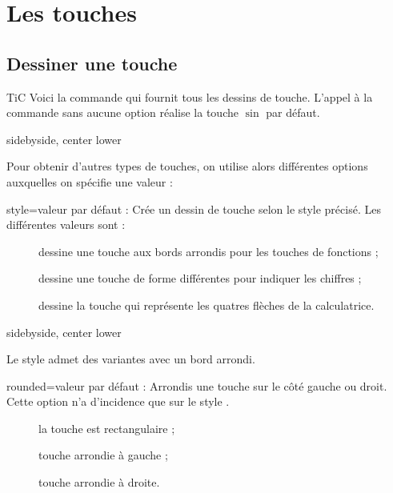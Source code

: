 \documentclass[10pt,french,a4paper]{article}
\begin{document}
\tableofcontents
\vspace*{2cm}

\section{Les touches}

\subsection{Dessiner une touche}

\begin{docCommand}{TiC}{}
    Voici la commande qui fournit tous les dessins de touche. L'appel à la commande  sans aucune option réalise la touche $\sin$ par défaut.
\end{docCommand}

\begin{dispExample*}{sidebyside, center lower}
\TiC
\end{dispExample*}
\medbreak

Pour obtenir d'autres types de touches, on utilise alors différentes options auxquelles on spécifie une valeur :\medbreak

\begin{docKey}{style}{=}{valeur par défaut : }
Crée un dessin de touche selon le style précisé. Les différentes valeurs sont :
\end{docKey}
\begin{description}
    \item[] dessine une touche aux bords arrondis pour les touches de fonctions ;
    \item[] dessine une touche de forme différentes pour indiquer les chiffres ;
    \item[] dessine la touche qui représente les quatres flèches de la calculatrice.
\end{description}

\begin{dispExample*}{sidebyside, center lower}
\TiC[style=general]
\TiC[style=number]
\TiC[style=arrows]
\end{dispExample*}
\medbreak

Le style  admet des variantes avec un bord arrondi.

\begin{docKey}{rounded}{=}{valeur par défaut : }
Arrondis une touche sur le côté gauche ou droit. Cette option n'a d'incidence que sur le style .
\end{docKey}
\begin{description}
    \item[] la touche est rectangulaire ;
    \item[] touche arrondie à gauche ;
    \item[] touche arrondie à droite.
\end{description}
\end{document}
